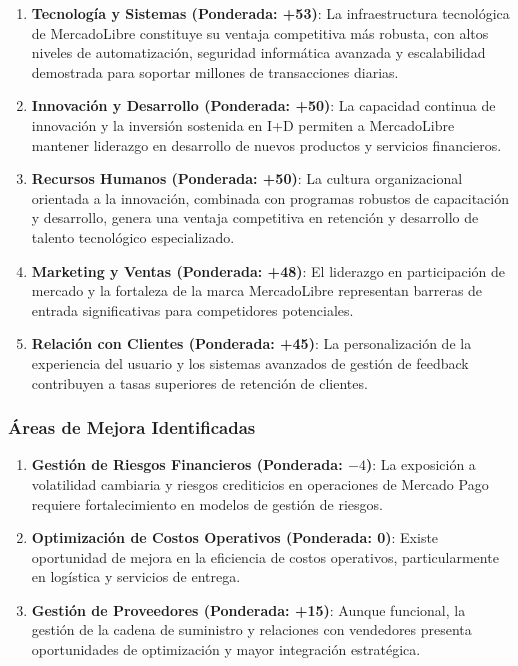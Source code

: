 \begin{enumerate}
\item \textbf{Tecnología y Sistemas (Ponderada: +53)}: La infraestructura tecnológica de MercadoLibre constituye su ventaja competitiva más robusta, con altos niveles de automatización, seguridad informática avanzada y escalabilidad demostrada para soportar millones de transacciones diarias.

\item \textbf{Innovación y Desarrollo (Ponderada: +50)}: La capacidad continua de innovación y la inversión sostenida en I+D permiten a MercadoLibre mantener liderazgo en desarrollo de nuevos productos y servicios financieros.

\item \textbf{Recursos Humanos (Ponderada: +50)}: La cultura organizacional orientada a la innovación, combinada con programas robustos de capacitación y desarrollo, genera una ventaja competitiva en retención y desarrollo de talento tecnológico especializado.

\item \textbf{Marketing y Ventas (Ponderada: +48)}: El liderazgo en participación de mercado y la fortaleza de la marca MercadoLibre representan barreras de entrada significativas para competidores potenciales.

\item \textbf{Relación con Clientes (Ponderada: +45)}: La personalización de la experiencia del usuario y los sistemas avanzados de gestión de feedback contribuyen a tasas superiores de retención de clientes.
\end{enumerate}

\subsubsection{Áreas de Mejora Identificadas}

\begin{enumerate}
\item \textbf{Gestión de Riesgos Financieros (Ponderada: $-4$)}: La exposición a volatilidad cambiaria y riesgos crediticios en operaciones de Mercado Pago requiere fortalecimiento en modelos de gestión de riesgos.

\item \textbf{Optimización de Costos Operativos (Ponderada: 0)}: Existe oportunidad de mejora en la eficiencia de costos operativos, particularmente en logística y servicios de entrega.

\item \textbf{Gestión de Proveedores (Ponderada: +15)}: Aunque funcional, la gestión de la cadena de suministro y relaciones con vendedores presenta oportunidades de optimización y mayor integración estratégica.
\end{enumerate}

